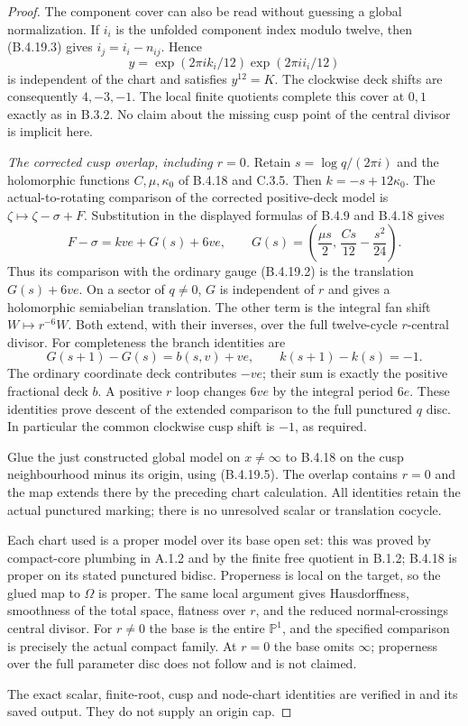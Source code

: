\begin{proof}
The component cover can also be read without
guessing a global normalization. If $i_i$ is the
unfolded component index modulo twelve, then
(B.4.19.3) gives $i_j=i_i-n_{ij}$. Hence
\[
 y=\exp(2\pi i k_i/12)\exp(2\pi i i_i/12)
\]
is independent of the chart and satisfies $y^{12}=K$.
The clockwise deck shifts are consequently $4,-3,-1$.
The local finite quotients complete this cover at
$0,1$ exactly as in B.3.2. No claim about the missing
cusp point of the central divisor is implicit here.

\emph{The corrected cusp overlap, including $r=0$.}
Retain $s=\log q/(2\pi i)$ and the holomorphic
functions $C,\mu,\kappa_0$ of B.4.18 and C.3.5.
Then $k=-s+12\kappa_0$. The actual-to-rotating
comparison of the corrected positive-deck model is
$\zeta\mapsto\zeta-\sigma+F$. Substitution in the
displayed formulas of B.4.9 and B.4.18 gives
\[
 F-\sigma=kve+G(s)+6ve,
 \qquad
 G(s)=\left(\frac{\mu s}{2},\,
                    \frac{Cs}{12}-\frac{s^2}{24}\right).
 \tag{B.4.19.5}
\]
Thus its comparison with the ordinary gauge
(B.4.19.2) is the translation $G(s)+6ve$.
On a sector of $q\ne0$, $G$ is independent of $r$
and gives a holomorphic semiabelian translation.
The other term is the integral fan shift
$W\mapsto r^{-6}W$. Both extend, with their inverses,
over the full twelve-cycle $r$-central divisor.
For completeness the branch identities are
\[
 G(s+1)-G(s)=b(s,v)+ve,
 \qquad k(s+1)-k(s)=-1.
\]
The ordinary coordinate deck contributes $-ve$;
their sum is exactly the positive fractional deck
$b$. A positive $r$ loop changes $6ve$ by the
integral period $6e$. These identities prove
descent of the extended comparison to the full
punctured $q$ disc. In particular the common
clockwise cusp shift is $-1$, as required.

Glue the just constructed global model on
$x\ne\infty$ to B.4.18 on the cusp neighbourhood
minus its origin, using (B.4.19.5). The overlap
contains $r=0$ and the map extends there by the
preceding chart calculation. All identities
retain the actual punctured marking; there is no
unresolved scalar or translation cocycle.

Each chart used is a proper model over its base
open set: this was proved by compact-core plumbing
in A.1.2 and by the finite free quotient in B.1.2;
B.4.18 is proper on its stated punctured bidisc.
Properness is local on the target, so the glued
map to $\Omega$ is proper. The same local argument
gives Hausdorffness, smoothness of the total space,
flatness over $r$, and the reduced normal-crossings
central divisor. For $r\ne0$ the base is the entire
$\mathbb P^1$, and the specified comparison is
precisely the actual compact family. At $r=0$ the
base omits $\infty$; properness over the full
parameter disc does not follow and is not claimed.

The exact scalar, finite-root, cusp and node-chart
identities are verified in
 and its
saved output. They do not supply an origin cap.
\end{proof}
